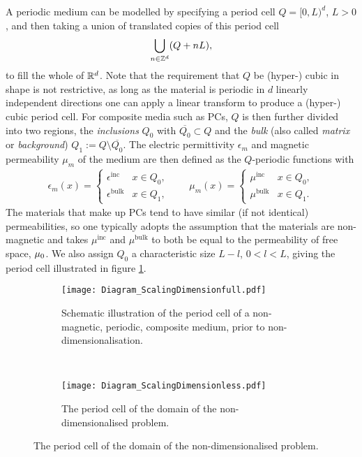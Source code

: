 A periodic medium can be modelled by specifying a period cell $Q=[0,L)^d$, $L>0$, and then taking a union of translated copies of this period cell
\begin{align*}
	\bigcup_{n\in\mathbb{Z}^d} (Q + nL),
\end{align*}
to fill the whole of $\mathbb{R}^d$.
Note that the requirement that $Q$ be (hyper-) cubic in shape is not restrictive, as long as the material is periodic in $d$ linearly independent directions one can apply a linear transform to produce a (hyper-) cubic period cell.
For composite media such as PCs, $Q$ is then further divided into two regions, the \emph{inclusions} $Q_0$ with $\overline{Q_0}\subset Q$ and the \emph{bulk} (also called \emph{matrix} or \emph{background}) $Q_1:=Q\setminus \overline{Q_0}$.
The electric permittivity $\epsilon_m$ and magnetic permeability $\mu_m$ of the medium are then defined as the $Q$-periodic functions with
\begin{align*}
	\epsilon_m(x) = \begin{cases} \epsilon^{\mathrm{inc}} & x\in Q_0, \\ \epsilon^{\mathrm{bulk}} & x\in Q_1, \end{cases}
	\qquad
	\mu_m(x) = \begin{cases} \mu^{\mathrm{inc}} & x\in Q_0, \\ \mu^{\mathrm{bulk}} & x\in Q_1. \end{cases}
\end{align*}
The materials that make up PCs tend to have similar (if not identical) permeabilities, so one typically adopts the assumption that the materials are non-magnetic and takes $\mu^{\mathrm{inc}}$ and $\mu^{\mathrm{bulk}}$ to both be equal to the permeability of free space, $\mu_0$.
We also assign $Q_0$ a characteristic size $L-l$, $0<l<L$, giving the period cell illustrated in figure \ref{fig:Diagram_ScalingDimensionfull}.
\begin{figure}[t]
	\centering
	\begin{subfigure}[t]{0.45\textwidth}
		\centering
		\texttt{[image: Diagram\_ScalingDimensionfull.pdf]}
		\caption{\label{fig:Diagram_ScalingDimensionfull} Schematic illustration of the period cell of a non-magnetic, periodic, composite medium, prior to non-dimensionalisation.}
	\end{subfigure}
	~
	\begin{subfigure}[t]{0.45\textwidth}
		\centering
		\texttt{[image: Diagram\_ScalingDimensionless.pdf]}
		\caption[Illustration of the relationship between physical properties and dimensionless parameters for composite media.]{\label{fig:Diagram_ScalingDimensionless} The period cell of the domain of the non-dimensionalised problem.}
	\end{subfigure}
\end{figure}

